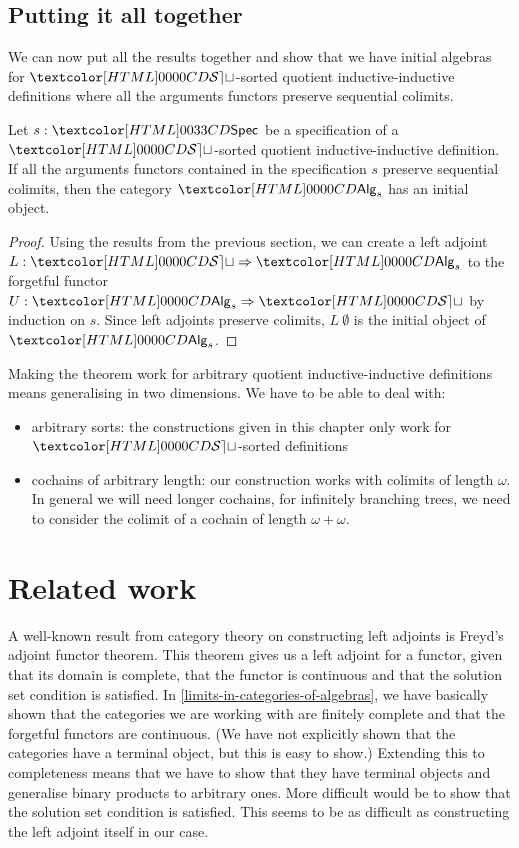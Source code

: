 \subsection{Putting it all together}

We can now put all the results together and show that we have initial
algebras for $\SET$-sorted quotient inductive-inductive definitions
where all the arguments functors preserve sequential colimits.

\begin{theorem}
  \label{initial-objects-qits}

  Let $s : \specty$ be a specification of a $\SET$-sorted quotient
  inductive-inductive definition. If all the arguments functors
  contained in the specification $s$ preserve sequential colimits,
  then the category $\Alg_s$ has an initial object.
\end{theorem}

\begin{proof}
  Using the results from the previous section, we can create a left
  adjoint $L : \Func{\SET}{\Alg_s}$ to the forgetful functor
  $U : \Func{\Alg_s}{\SET}$ by induction on $s$. Since left adjoints
  preserve colimits, $L\ \emptyset$ is the initial object of $\Alg_s$.
\end{proof}

Making the theorem work for arbitrary quotient inductive-inductive
definitions means generalising in two dimensions. We have to be able to deal with:
\begin{itemize}
\item arbitrary sorts: the constructions given in this chapter only work for $\SET$-sorted definitions
\item cochains of arbitrary length: our construction works with
  colimits of length $\omega$. In general we will need longer
  cochains, \eg for infinitely branching trees, we need to consider
  the colimit of a cochain of length $\omega + \omega$.
\end{itemize}

\section{Related work}

A well-known result from category theory on constructing left adjoints
is Freyd's adjoint functor theorem. This theorem gives us a left
adjoint for a functor, given that its domain is complete, that the
functor is continuous and that the solution set condition is
satisfied. In \cref{limits-in-categories-of-algebras}, we have
basically shown that the categories we are working with are finitely
complete and that the forgetful functors are continuous. (We have not
explicitly shown that the categories have a terminal object, but this
is easy to show.)  Extending this to completeness means that we have
to show that they have terminal objects and generalise binary products
to arbitrary ones. More difficult would be to show that the solution
set condition is satisfied. This seems to be as difficult as
constructing the left adjoint itself in our case.

